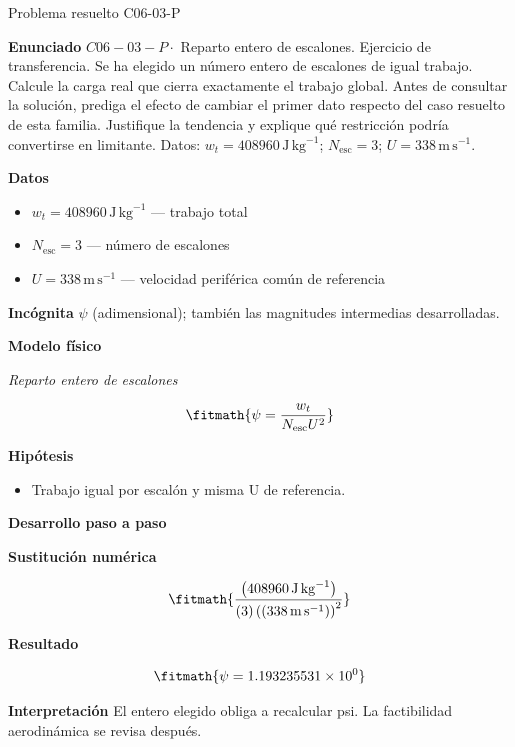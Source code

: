 \documentclass[10pt,openany]{book}
\begin{document}
\begin{studiumworked}{Problema resuelto C06-03-P}


\noindent\textbf{Enunciado}
\(C06-03-P \cdot\) Reparto entero de escalones. Ejercicio de transferencia. Se ha elegido un número entero de escalones de igual trabajo. Calcule la carga real que cierra exactamente el trabajo global. Antes de consultar la solución, prediga el efecto de cambiar el primer dato respecto del caso resuelto de esta familia. Justifique la tendencia y explique qué restricción podría convertirse en limitante. Datos: \(w_t=408960\, \mathrm{J}\,\mathrm{kg}^{-1}\); \(N_{\mathrm{esc}}=3\); \(U=338\, \mathrm{m}\,\mathrm{s}^{-1}\).

\noindent\textbf{Datos}
\begin{itemize}
\item $w_t = 408960\,\mathrm{J}\,\mathrm{kg}^{-1}$ — trabajo total
\item $N_{\mathrm{esc}} = 3$ — número de escalones
\item $U = 338\,\mathrm{m}\,\mathrm{s}^{-1}$ — velocidad periférica común de referencia
\end{itemize}

\noindent\textbf{Incógnita}
$\psi$ (adimensional); también las magnitudes intermedias desarrolladas.

\noindent\textbf{Modelo físico}

\noindent\textit{Reparto entero de escalones}

\[
\fitmath{\psi=\frac{w_t}{N_{\mathrm{esc}} U^{2}}}
\]

\noindent\textbf{Hipótesis}
\begin{itemize}
\item Trabajo igual por escalón y misma U de referencia.
\end{itemize}

\noindent\textbf{Desarrollo paso a paso}



\noindent\textbf{Sustitución numérica}

\[
\fitmath{\frac{\left(408960\,\mathrm{J}\,\mathrm{kg}^{-1}\right)}{\left(3\right) \left(\left(338\,\mathrm{m}\,\mathrm{s}^{-1}\right)\right)^{2}}}
\]

\noindent\textbf{Resultado}

\[
\fitmath{\psi=1.193235531\times10^{0}}
\]

\noindent\textbf{Interpretación}
El entero elegido obliga a recalcular psi. La factibilidad aerodinámica se revisa después.


\end{studiumworked}
\end{document}
